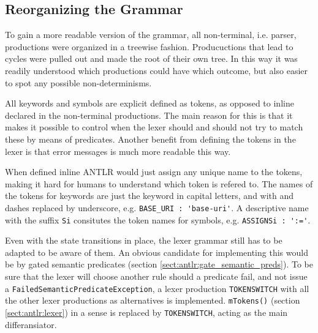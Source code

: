 \subsection{Reorganizing the Grammar}
\label{sect:rewriteGrammar:reorganizing}

To gain a more readable version of the grammar, all non-terminal, i.e. parser, productions were organized in a treewise fashion. Producuctions that lead to cycles were pulled out and made the root of their own tree. In this way it was readily understood which productions could have which outcome, but also easier to spot any possible non-determinisms.

All keywords and symbols are explicit defined as tokens, as opposed to inline declared in the non-terminal productions. The main reason for this is that it makes it possible to control when the lexer should and should not try to match these by means of predicates. Another benefit from defining the tokens in the lexer is that error messages is much more readable this way. 

When defined inline ANTLR would just assign any unique name to the tokens, making it hard for humans to understand which token is refered to. The names of the tokens for keywords are just the keyword in capital letters, and with and dashes replaced by underscore, e.g. \verb!BASE_URI : 'base-uri'!. A descriptive name with the suffix \verb!Si! consitutes the token names for symbols, e.g. \verb!ASSIGNSi : ':='!.

Even with the state transitions in place, the lexer grammar still has to be adapted to be aware of them. An obvious candidate for implementing this would be by gated semantic predicates (section \ref{sect:antlr:gate_semantic_preds}). To be sure that the lexer will choose another rule should a predicate fail, and not issue a \verb!FailedSemanticPredicateException!, a lexer production \verb!TOKENSWITCH! with all the other lexer productions as alternatives is implemented. \verb!mTokens()! (section \ref{sect:antlr:lexer}) in a sense is replaced by \verb!TOKENSWITCH!, acting as the main differansiator. 


